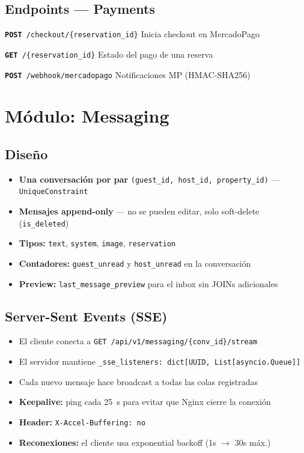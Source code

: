 \documentclass[12pt,a4paper]{report}
\newcommand{\apiendpoint}[3]{%
  \noindent\texttt{\textcolor{beelprimary}{\textbf{#1}}\ \textcolor{beeltier}{#2}}%
  \hfill\textcolor{beelgray}{\small #3}\par\smallskip
}
\begin{document}
\subsection{Endpoints --- Payments}

\begin{tcolorbox}[beelinfo, title={/api/v1/payments}]
\apiendpoint{POST}{/checkout/\{reservation\_id\}}{Inicia checkout en MercadoPago}
\apiendpoint{GET}{/\{reservation\_id\}}{Estado del pago de una reserva}
\apiendpoint{POST}{/webhook/mercadopago}{Notificaciones MP (HMAC-SHA256)}
\end{tcolorbox}

\section{M\'odulo: Messaging}

\subsection{Dise\~no}

\begin{itemize}[leftmargin=*]
  \item \textbf{Una conversaci\'on por par} \texttt{(guest\_id, host\_id, property\_id)} ---
        \texttt{UniqueConstraint}
  \item \textbf{Mensajes append-only} --- no se pueden editar, solo soft-delete (\texttt{is\_deleted})
  \item \textbf{Tipos:} \texttt{text}, \texttt{system}, \texttt{image}, \texttt{reservation}
  \item \textbf{Contadores:} \texttt{guest\_unread} y \texttt{host\_unread} en la conversaci\'on
  \item \textbf{Preview:} \texttt{last\_message\_preview} para el inbox sin JOINs adicionales
\end{itemize}

\subsection{Server-Sent Events (SSE)}

\begin{itemize}[leftmargin=*]
  \item El cliente conecta a \texttt{GET /api/v1/messaging/\{conv\_id\}/stream}
  \item El servidor mantiene \texttt{\_sse\_listeners: dict[UUID, List[asyncio.Queue]]}
  \item Cada nuevo mensaje hace broadcast a todas las colas registradas
  \item \textbf{Keepalive:} ping cada 25~s para evitar que Nginx cierre la conexi\'on
  \item \textbf{Header:} \texttt{X-Accel-Buffering: no}
  \item \textbf{Reconexiones:} el cliente usa exponential backoff (1s $\rightarrow$ 30s m\'ax.)
\end{itemize}
\end{document}
